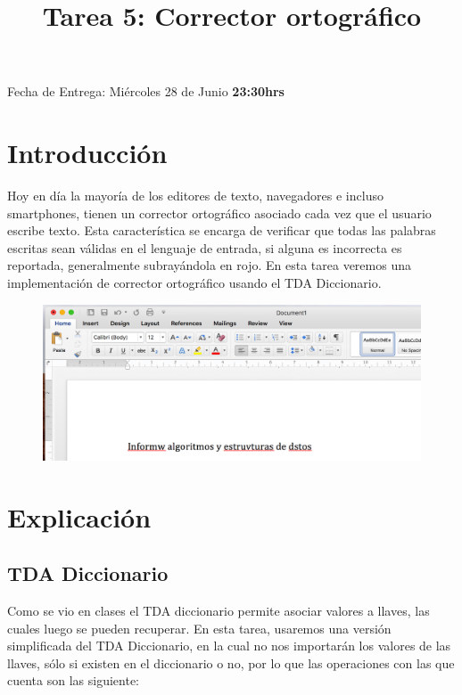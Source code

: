 \documentclass[dcc]{fcfmcourse}
\title{Tarea 5: Corrector ortográfico}
\begin{document}
\maketitle
\vspace{-2ex}
\begin{center}
Fecha de Entrega: Miércoles 28 de Junio  \textbf{23:30hrs} \\
\end{center}


\section{Introducción}
Hoy en día la mayoría de los editores de texto, navegadores e incluso smartphones, tienen un corrector ortográfico asociado cada vez que el usuario escribe texto. Esta característica se encarga de verificar que todas las palabras escritas sean válidas en el lenguaje de entrada, si alguna es incorrecta es reportada, generalmente subrayándola en rojo. En esta tarea veremos una implementación de corrector ortográfico usando el TDA Diccionario.

\begin{figure}[!h]
    \centering
    \includegraphics[scale=0.55]{imagenes/word.png}
\end{figure}

\newpage
\section{Explicación}

\subsection{TDA Diccionario}

Como se vio en clases el TDA diccionario permite asociar valores a llaves, las cuales luego se pueden recuperar. En esta tarea, usaremos una versión simplificada del TDA Diccionario, en la cual no nos importarán los valores de las llaves, sólo si existen en el diccionario o no, por lo que las  operaciones con las que cuenta son las siguiente:
\end{document}
